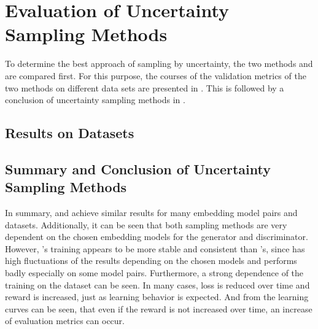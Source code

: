 \section{Evaluation of Uncertainty Sampling Methods}
\label{ch:evaluation:sec:evaluation_methods}
%
To determine the best approach of sampling by uncertainty, the two methods \usmax and \ussoftmax are compared first.
For this purpose, the courses of the validation metrics of the two methods on different data sets are presented in .
This is followed by a conclusion of uncertainty sampling methods in  .
%
\subsection{Results on Datasets} \label{subsec:methods_results}














%
\subsection{Summary and Conclusion of Uncertainty Sampling Methods} 
\label{subsec:methods_conclusion}
In summary, \usmax and \ussoftmax achieve similar results for many embedding model pairs and datasets.
Additionally, it can be seen that both sampling methods are very dependent on the chosen embedding models for the generator and discriminator.
However, \ussoftmax's training appears to be more stable and consistent than \usmax's, since \usmax has high fluctuations of the results depending on the chosen models and performs badly especially on some model pairs.
Furthermore, a strong dependence of the training on the dataset can be seen.
In many cases, loss is reduced over time and reward is increased, just as learning behavior is expected.
And from the learning curves can be seen, that even if the reward is not increased over time, an increase of evaluation metrics can occur.

